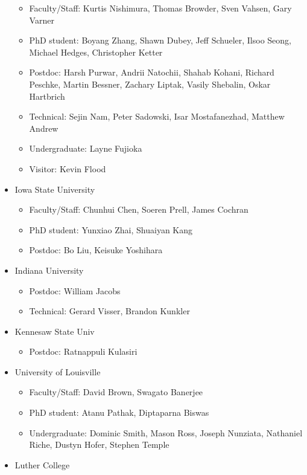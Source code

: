 \begin{itemize}
\begin{itemize}
\item Faculty/Staff:  Kurtis Nishimura, Thomas  Browder, Sven Vahsen, Gary  Varner
\item PhD student:  Boyang Zhang, Shawn Dubey, Jeff Schueler, Ilsoo Seong, Michael Hedges, Christopher Ketter
\item Postdoc:  Harsh Purwar, Andrii Natochii, Shahab Kohani, Richard Peschke, Martin Bessner, Zachary Liptak, Vasily Shebalin, Oskar Hartbrich
\item Technical:  Sejin Nam, Peter Sadowski, Isar Mostafanezhad, Matthew Andrew
\item Undergraduate:  Layne Fujioka
\item Visitor:  Kevin Flood
\end{itemize}
\item Iowa State University
\begin{itemize}

\item Faculty/Staff:  Chunhui Chen, Soeren Prell, James Cochran
\item PhD student:  Yunxiao Zhai, Shuaiyan Kang
\item Postdoc:  Bo Liu, Keisuke Yoshihara
\end{itemize}
\item Indiana University
\begin{itemize}

\item Postdoc:  William Jacobs
\item Technical:  Gerard Visser, Brandon Kunkler
\end{itemize}
\item Kennesaw State Univ
\begin{itemize}

\item Postdoc:  Ratnappuli  Kulasiri
\end{itemize}
\item University of Louisville
\begin{itemize}

\item Faculty/Staff:  David Brown, Swagato Banerjee
\item PhD student:  Atanu Pathak, Diptaparna Biswas
\item Undergraduate:  Dominic Smith, Mason Ross, Joseph Nunziata, Nathaniel Riche, Dustyn Hofer, Stephen Temple
\end{itemize}
\item Luther College
\begin{itemize}


\end{itemize}
\end{itemize}
